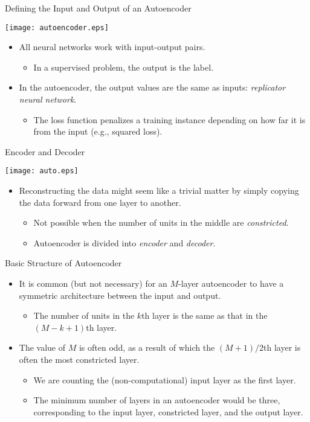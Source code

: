 \begin{frame}{Defining the Input and Output of an Autoencoder}
\begin{center}
\texttt{[image: autoencoder.eps]}
\end{center}
\begin{itemize}
\item All neural networks work with input-output pairs.
\begin{itemize}
\item In a supervised problem,  the output is the
label.
\end{itemize}
\item In the autoencoder, the output values  are the same as inputs: {\em replicator neural network}.
\begin{itemize}
\item The loss function penalizes a training instance depending on
how far it is from the input (e.g., squared loss).
\end{itemize}
\end{itemize}
\end{frame}


\begin{frame}{Encoder and Decoder}
\begin{center}
\texttt{[image: auto.eps]}
\end{center}
\begin{itemize}
\item Reconstructing the  data might seem like a trivial matter by
simply copying the data forward from one layer to another.
\begin{itemize}
\item Not
possible when the number of units in the middle are {\em
constricted}.
\item Autoencoder is divided into {\em encoder} and {\em decoder}.
\end{itemize}
\end{itemize}
\end{frame}


\begin{frame}{Basic Structure of Autoencoder}
\begin{itemize}
\item  It is common (but not necessary) for an $M$-layer  autoencoder to have a symmetric
architecture between the input and output.
\begin{itemize}
\item The number of units in the $k$th layer is the same as that in the
$(M-k+1)$th layer.
\end{itemize}
\item The value of $M$ is often odd, as a result of which the $(M+1)/2$th
layer is often the most constricted layer.
\begin{itemize}
\item We are counting the
(non-computational) input layer as the first layer. \item The
minimum number of layers in an autoencoder would be three,
corresponding to the input layer, constricted layer, and the output
layer.
\end{itemize}
\end{itemize}
\end{frame}


